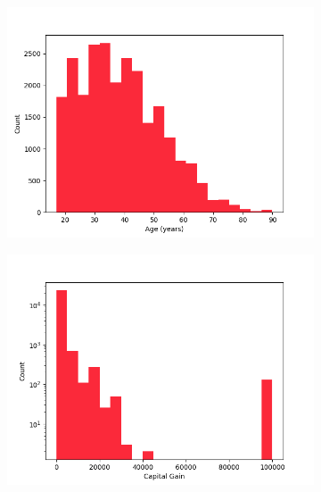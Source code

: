 \documentclass{article}
\begin{document}
\begin{figure}[H]
    \centering
    \begin{subfigure}{0.3\textwidth}
        \includegraphics[width=\linewidth]{img/age.png}
    \end{subfigure}
    \begin{subfigure}{0.3\textwidth}
        \includegraphics[width=\linewidth,]{img/capital-gain.png}
    \end{subfigure}
    \begin{subfigure}{0.3\textwidth}

\end{subfigure}
\end{figure}
\end{document}
